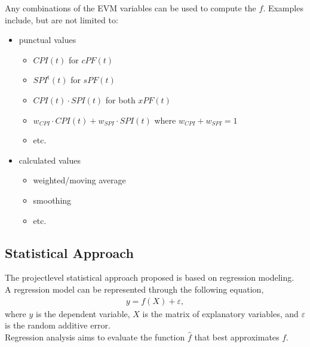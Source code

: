 \documentclass[letterpaper,10pt,english]{jupyterBook}
\begin{document}
\sphinxAtStartPar
Any combinations of the EVM variables can be used to compute the \(f\).
Examples include, but are not limited to:
\begin{itemize}
\item {} 
\sphinxAtStartPar
punctual values
\begin{itemize}
\item {} 
\sphinxAtStartPar
\(CPI{(t)}\) for \(cPF{(t)}\)

\item {} 
\sphinxAtStartPar
\(SPI^\text{t}{(t)}\) for \(sPF{(t)}\)

\item {} 
\sphinxAtStartPar
\(CPI{(t)} \cdot SPI{(t)}\) for both \(xPF{(t)}\)

\item {} 
\sphinxAtStartPar
\(w_{CPI} \cdot CPI{(t)} + w_{SPI} \cdot SPI{(t)}\) where \(w_{CPI} + w_{SPI} = 1\)

\item {} 
\sphinxAtStartPar
etc.

\end{itemize}

\item {} 
\sphinxAtStartPar
calculated values
\begin{itemize}
\item {} 
\sphinxAtStartPar
weighted/moving average

\item {} 
\sphinxAtStartPar
smoothing

\item {} 
\sphinxAtStartPar
etc.

\end{itemize}

\end{itemize}


\subsection{Statistical Approach}
\label{\detokenize{PM/eac:statistical-approach}}
\sphinxAtStartPar
The project\sphinxhyphen{}level statistical approach proposed is based on regression modeling. \\
A regression model can be represented through the following equation,
\begin{equation*}
\begin{split}
y = f(X) + \varepsilon,
\end{split}
\end{equation*}
\sphinxAtStartPar
where \(y\) is the dependent variable, \(X\) is the matrix of explanatory variables, and \(\varepsilon\) is the random additive error. \\
Regression analysis aims to evaluate the function \(\widehat{f}\) that best approximates \(f\).
\end{document}
